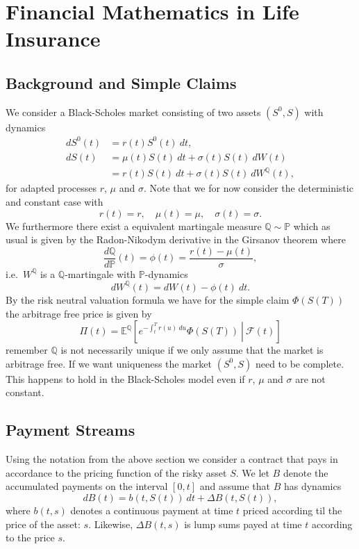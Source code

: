 \documentclass[
]{book}
\begin{document}
\hypertarget{financial-mathematics-in-life-insurance}{%
\section{Financial Mathematics in Life Insurance}\label{financial-mathematics-in-life-insurance}}

\hypertarget{background-and-simple-claims}{%
\subsection{Background and Simple Claims}\label{background-and-simple-claims}}

We consider a Black-Scholes market consisting of two assets \((S^0,S)\) with dynamics
\begin{align*}
dS^0(t)&=r(t)S^0(t)\ dt,\\
dS(t)&=\mu(t)S(t)\ dt+\sigma(t) S(t)\ dW(t)\\
&=r(t)S(t)\ dt + \sigma(t)S(t)\ dW^{\mathbb Q}(t),
\end{align*}
for adapted processes \(r\), \(\mu\) and \(\sigma\). Note that we for now consider the deterministic and constant case with
\[
r(t)=r,\quad\mu(t)=\mu, \quad\sigma(t)=\sigma.
\]
We furthermore there exist a equivalent martingale measure \(\mathbb Q\sim \mathbb P\) which as usual is given by the Radon-Nikodym derivative in the Girsanov theorem where
\[
\frac{d\mathbb Q}{d\mathbb P}(t)=\phi(t)=\frac{r(t)-\mu(t)}{\sigma},
\]
i.e.~\(W^{\mathbb Q}\) is a \(\mathbb Q\)-martingale with \(\mathbb P\)-dynamics
\[
dW^{\mathbb Q}(t)=dW(t)-\phi(t)\ dt.
\]
By the risk neutral valuation formula we have for the simple claim \(\Phi(S(T))\) the arbitrage free price is given by
\[
\Pi(t)=\mathbb E^{\mathbb Q}\left[\left.e^{-\int_t^Tr(u)\ du}\Phi(S(T))\ \right\vert\ \mathcal F(t)\right]
\]
remember \(\mathbb Q\) is not necessarily unique if we only assume that the market is arbitrage free. If we want uniqueness the market \((S^0,S)\) need to be complete. This happens to hold in the Black-Scholes model even if \(r\), \(\mu\) and \(\sigma\) are not constant.

\hypertarget{payment-streams}{%
\subsection{Payment Streams}\label{payment-streams}}

Using the notation from the above section we consider a contract that pays in accordance to the pricing function of the risky asset \(S\). We let \(B\) denote the accumulated payments on the interval \([0,t]\) and assume that \(B\) has dynamics
\[
dB(t)=b(t,S(t))\ dt+\Delta B(t,S(t)),
\]
where \(b(t,s)\) denotes a continuous payment at time \(t\) priced according til the price of the asset: \(s\). Likewise, \(\Delta B(t,s)\) is lump sums payed at time \(t\) according to the price \(s\).
\end{document}
